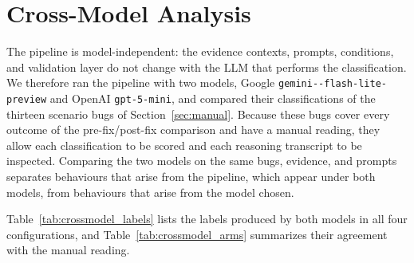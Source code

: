 \documentclass{iutbscthesis}
\newcommand{\modelname}{\texttt{gemini-\allowbreak 3.1-\allowbreak flash-\allowbreak lite-\allowbreak preview}}
\begin{document}
\section{Cross-Model Analysis}
\label{sec:crossmodel}

The pipeline is model-independent: the evidence contexts, prompts, conditions, and validation layer do not change with the LLM that performs the classification. We therefore ran the pipeline with two models, Google \modelname{} and OpenAI \texttt{gpt-5-mini}, and compared their classifications of the thirteen scenario bugs of Section~\ref{sec:manual}. Because these bugs cover every outcome of the pre-fix/post-fix comparison and have a manual reading, they allow each classification to be scored and each reasoning transcript to be inspected. Comparing the two models on the same bugs, evidence, and prompts separates behaviours that arise from the pipeline, which appear under both models, from behaviours that arise from the model chosen.

Table~\ref{tab:crossmodel_labels} lists the labels produced by both models in all four configurations, and Table~\ref{tab:crossmodel_arms} summarizes their agreement with the manual reading.
\end{document}
